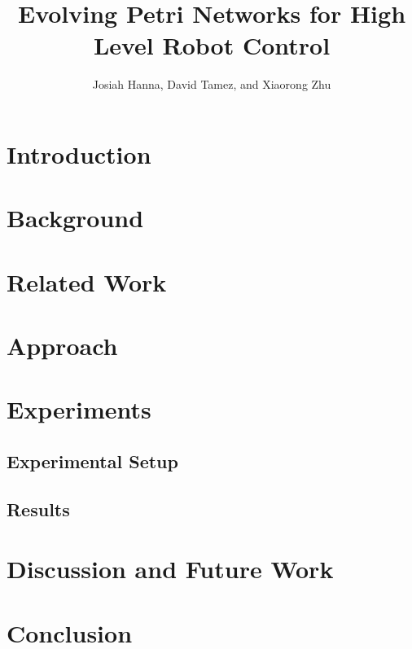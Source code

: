 \documentclass[12pt,a4paper,twocolumn]{article}
\author{Josiah Hanna, David Tamez, and Xiaorong Zhu}
\title{Evolving Petri Networks for High Level Robot Control}
\begin{document}
\maketitle

\begin{abstract}

\end{abstract}

\section{Introduction}

\section{Background}

\section{Related Work}

\section{Approach}

\section{Experiments}

\subsection{Experimental Setup}

\subsection{Results}

\section{Discussion and Future Work}

\section{Conclusion}



\end{document}
